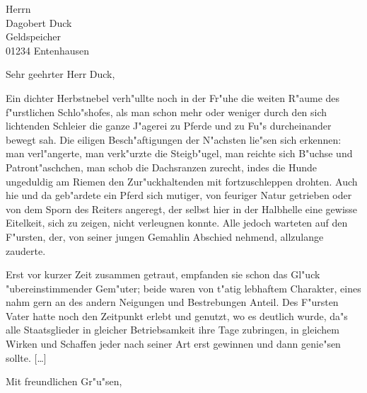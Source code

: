 \documentclass[finanz, rollstuhl, ddc, emas]{tudletter}
\begin{document}





\subject{Novelle}

\begin{letter}{Herrn \\ Dagobert Duck \\ Geldspeicher \\ 01234 Entenhausen}
    \opening{Sehr geehrter Herr Duck,}
        Ein dichter Herbstnebel verh"ullte noch in der Fr"uhe die weiten R"aume des
        f"urstlichen Schlo"shofes, als man schon mehr oder weniger durch den sich
        lichtenden Schleier die ganze J"agerei zu Pferde und zu Fu"s durcheinander
        bewegt sah. Die eiligen Besch"aftigungen der N"achsten lie"sen sich erkennen:
        man verl"angerte, man verk"urzte die Steigb"ugel, man reichte sich B"uchse
        und Patront"aschchen, man schob die Dachsranzen zurecht, indes die Hunde
        ungeduldig am Riemen den Zur"uckhaltenden mit fortzuschleppen drohten. Auch
        hie und da geb"ardete ein Pferd sich mutiger, von feuriger Natur getrieben
        oder von dem Sporn des Reiters angeregt, der selbst hier in der Halbhelle
        eine gewisse Eitelkeit, sich zu zeigen, nicht verleugnen konnte. Alle jedoch
        warteten auf den F"ursten, der, von seiner jungen Gemahlin Abschied nehmend,
        allzulange zauderte.
        
        Erst vor kurzer Zeit zusammen getraut, empfanden sie schon das Gl"uck
        "ubereinstimmender Gem"uter; beide waren von t"atig lebhaftem Charakter, eines
        nahm gern an des andern Neigungen und Bestrebungen Anteil. Des F"ursten Vater
        hatte noch den Zeitpunkt erlebt und genutzt, wo es deutlich wurde, da"s alle
        Staatsglieder in gleicher Betriebsamkeit ihre Tage zubringen, in gleichem
        Wirken und Schaffen jeder nach seiner Art erst gewinnen und dann genie"sen sollte.
        [\ldots]
    \closing{Mit freundlichen Gr"u"sen,}
\end{letter}
\end{document}
